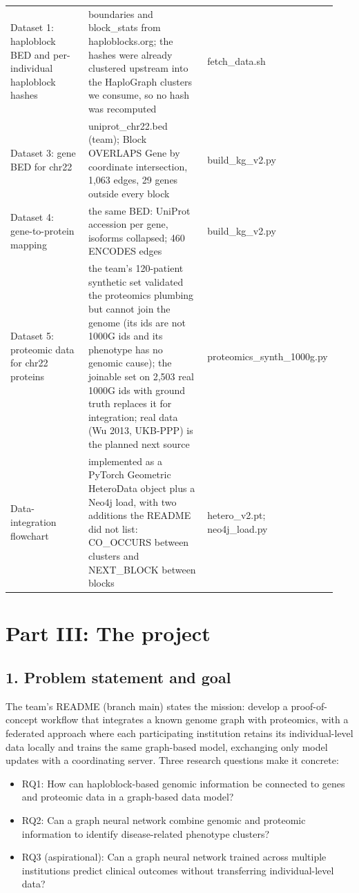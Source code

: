 \documentclass[11pt,a4paper]{article}
\begin{document}
\begin{longtable}{p{0.282\linewidth}p{0.423\linewidth}p{0.235\linewidth}}
Dataset 1: haploblock BED and per-individual haploblock hashes & boundaries and block\_stats from haploblocks.org; the hashes were already clustered upstream into the HaploGraph clusters we consume, so no hash was recomputed & fetch\_data.sh \\
Dataset 3: gene BED for chr22 & uniprot\_chr22.bed (team); Block OVERLAPS Gene by coordinate intersection, 1,063 edges, 29 genes outside every block & build\_kg\_v2.py \\
Dataset 4: gene-to-protein mapping & the same BED: UniProt accession per gene, isoforms collapsed; 460 ENCODES edges & build\_kg\_v2.py \\
Dataset 5: proteomic data for chr22 proteins & the team's 120-patient synthetic set validated the proteomics plumbing but cannot join the genome (its ids are not 1000G ids and its phenotype has no genomic cause); the joinable set on 2,503 real 1000G ids with ground truth replaces it for integration; real data (Wu 2013, UKB-PPP) is the planned next source & proteomics\_synth\_1000g.py \\
Data-integration flowchart & implemented as a PyTorch Geometric HeteroData object plus a Neo4j load, with two additions the README did not list: CO\_OCCURS between clusters and NEXT\_BLOCK between blocks & hetero\_v2.pt; neo4j\_load.py \\
\bottomrule
\end{longtable}

\section{Part III: The project}

\subsection{1. Problem statement and goal}

The team's README (branch main) states the mission: develop a proof-of-concept workflow that integrates a known genome graph with proteomics, with a federated approach where each participating institution retains its individual-level data locally and trains the same graph-based model, exchanging only model updates with a coordinating server. Three research questions make it concrete:

\begin{itemize}[leftmargin=1.4em]
  \item RQ1: How can haploblock-based genomic information be connected to genes and proteomic data in a graph-based data model?
  \item RQ2: Can a graph neural network combine genomic and proteomic information to identify disease-related phenotype clusters?
  \item RQ3 (aspirational): Can a graph neural network trained across multiple institutions predict clinical outcomes without transferring individual-level data?
\end{itemize}
\end{document}
